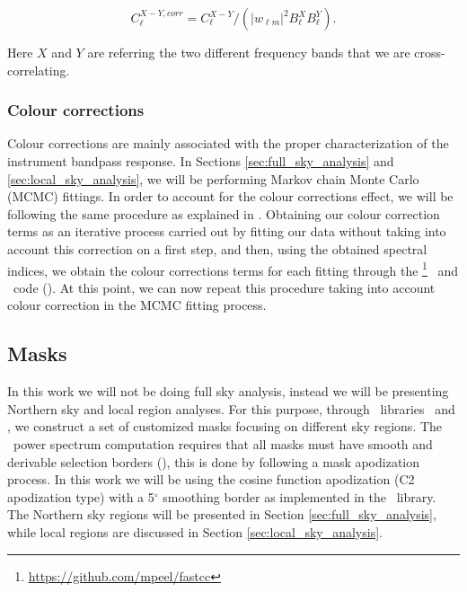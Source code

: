 \begin{equation}
    \label{eq:corrected_cross}
    C_{\ell}^{X-Y, corr} = C_{\ell}^{X-Y} / ( |w_{\ell m}|^2 B_{\ell}^{X} B_{\ell}^{Y}).
\end{equation}

Here $X$ and $Y$ are referring the two different frequency bands that we are cross-correlating. 

\subsubsection{Colour corrections}
\label{sec:colour_corrections}

Colour corrections are mainly associated with the proper characterization of the instrument bandpass response. In Sections \ref{sec:full_sky_analysis} 
and \ref{sec:local_sky_analysis}, we will be performing Markov chain Monte Carlo (MCMC) fittings. In order to account for the colour corrections effect, 
we will be following
the same procedure as explained in \citealp{Planck_2020_cc}. Obtaining our colour correction terms as an iterative process carried out by fitting our data 
without taking into account this correction on a first step, and then, using the obtained spectral indices, we obtain the colour corrections terms for 
each fitting through the \fastcc \footnote{\url{https://github.com/mpeel/fastcc}} \python\ and \IDL\ code (\citealp{Fastcc}). At this point, we can now 
repeat this procedure taking into account colour correction in the MCMC fitting process.

\subsection{Masks}
\label{sec:masks}

In this work we will not be doing full sky analysis, instead we will be presenting Northern sky and local region analyses. For this purpose, through 
\python\ libraries \healpix\ and \namaster, we construct a set of customized masks focusing on different sky regions. The \namaster\ power spectrum computation 
requires that all masks must have smooth and derivable selection borders (\citealp{Namaster}), this is done by following a mask apodization process. In this 
work we will be using the cosine function apodization (C2 apodization type) with a 5$^{\circ}$ smoothing border as implemented in the \namaster\ library. 
The Northern sky regions will be presented in Section \ref{sec:full_sky_analysis}, while local regions are discussed in Section \ref{sec:local_sky_analysis}.

